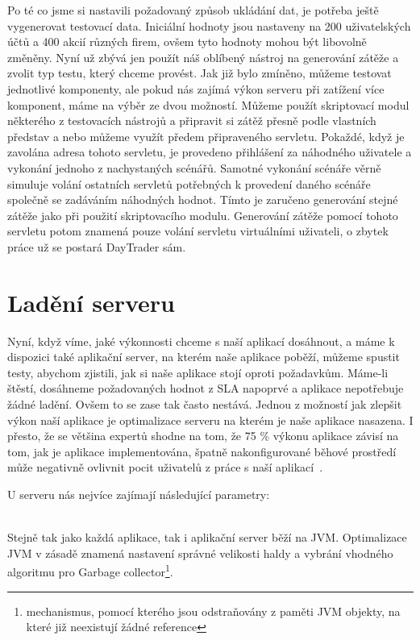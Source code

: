 \documentclass[122pt,oneside]{fithesis}
\begin{document}
Po té co jsme si nastavili požadovaný způsob ukládání dat, je potřeba ještě vygenerovat testovací data. Iniciální hodnoty jsou nastaveny na 200 uživatelských účtů a 400 akcií různých firem, ovšem tyto hodnoty mohou být libovolně změněny. Nyní už zbývá jen použít náš oblíbený nástroj na generování zátěže a zvolit typ testu, který chceme provést. Jak již bylo zmíněno, můžeme testovat jednotlivé komponenty, ale pokud nás zajímá výkon serveru při zatížení více komponent, máme na výběr ze dvou možností. Můžeme použít skriptovací modul některého z testovacích nástrojů a připravit si zátěž přesně podle vlastních představ a nebo můžeme využít předem připraveného servletu. Pokaždé, když je zavolána adresa tohoto servletu, je provedeno přihlášení za náhodného uživatele a vykonání jednoho z nachystaných scénářů. Samotné vykonání scénáře věrně simuluje volání ostatních servletů potřebných k provedení daného scénáře společně se zadáváním náhodných hodnot. Tímto je zaručeno generování stejné zátěže jako při použití skriptovacího modulu. Generování zátěže pomocí tohoto servletu potom znamená pouze volání servletu virtuálními uživateli, o zbytek práce už se postará DayTrader sám.

\section{Ladění serveru}
Nyní, když víme, jaké výkonnosti chceme s naší aplikací dosáhnout, a máme k dispozici také aplikační server, na kterém naše aplikace poběží, můžeme spustit testy, abychom zjistili, jak si naše aplikace stojí oproti požadavkům. Máme-li štěstí, dosáhneme požadovaných hodnot z SLA napoprvé a aplikace nepotřebuje žádné ladění. Ovšem to se zase tak často nestává. Jednou z možností jak zlepšit výkon naší aplikace je optimalizace serveru na kterém je naše aplikace nasazena. I přesto, že se většina expertů shodne na tom, že 75 \% výkonu aplikace závisí na tom, jak je aplikace implementována, špatně nakonfigurované běhové prostředí může negativně ovlivnit pocit uživatelů z práce s naší aplikací~\cite{performanceTuning}. 

U serveru nás nejvíce zajímají následující parametry:

\vspace{5 mm}
\\\indent Stejně tak jako každá aplikace, tak i aplikační server běží na JVM. Optimalizace JVM v zásadě znamená nastavení správné velikosti haldy a vybrání vhodného algoritmu pro Garbage collector\footnote[1]{mechanismus, pomocí kterého jsou odstraňovány z paměti JVM objekty, na které již neexistují žádné reference}.
\end{document}
